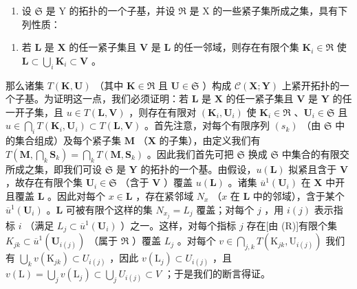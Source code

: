 \begin{enumerate}
\def\labelenumi{\arabic{enumi})}
\setcounter{enumi}{1}
\tightlist
\item
  设 \(\mathfrak{S}\) 是 Y 的拓扑的一个子基，并设 \(\mathfrak{R}\) 是 X 的一些紧子集所成之集，具有下列性质：
\end{enumerate}

\begin{enumerate}
\def\labelenumi{(\Alph{enumi})}
\setcounter{enumi}{17}
\tightlist
\item
  若 \(\mathbf{L}\) 是 \(\mathbf{X}\) 的任一紧子集且 \(\mathbf{V}\) 是 \(\mathbf{L}\) 的任一邻域，则存在有限个集 \(\mathbf{K}_i \in \mathfrak{R}\) 使 \(\mathbf{L} \subset \bigcup_{i} \mathbf{K}_i \subset \mathbf{V}\) 。
\end{enumerate}

那么诸集 \(T(\mathbf{K}, \mathbf{U})\) （其中 \(\mathbf{K} \in \mathfrak{R}\) 且 \(\mathbf{U} \in \mathfrak{S}\) ）构成 \(\mathcal{C}(\mathbf{X}; \mathbf{Y})\) 上紧开拓扑的一个子基。为证明这一点，我们必须证明：若 \(\mathbf{L}\) 是 \(\mathbf{X}\) 的任一紧子集且 \(\mathbf{V}\) 是 \(\mathbf{Y}\) 的任一开子集，且 \(u \in T(\mathbf{L}, \mathbf{V})\) ，则存在有限对 \((\mathbf{K}_i, \mathbf{U}_i)\) 使 \(\mathbf{K}_i \in \mathfrak{R}\) 、\(\mathbf{U}_i \in \mathfrak{S}\) 且 \(u \in \bigcap_{i} T(\mathbf{K}_i, \mathbf{U}_i) \subset T(\mathbf{L}, \mathbf{V})\) 。首先注意，对每个有限序列 \((s_k)\) （由 \(\mathfrak{S}\) 中的集合组成）及每个紧子集 \(\mathbf{M}\) （\(\mathbf{X}\) 的子集），由定义我们有 \(T\left(\mathbf{M}, \bigcap_k \mathbf{S}_k\right) = \bigcap_k T(\mathbf{M}, \mathbf{S}_k)\) 。因此我们首先可把 \(\mathfrak{S}\) 换成 \(\mathfrak{S}\) 中集合的有限交所成之集，即我们可设 \(\mathfrak{S}\) 是 \(\mathbf{Y}\) 的拓扑的一个基。由假设，\(u(\mathbf{L})\) 拟紧且含于 \(\mathbf{V}\) ，故存在有限个集 \(\mathbf{U}_i \in \mathfrak{S}\) （含于 \(\mathbf{V}\) ）覆盖 \(u(\mathbf{L})\) 。诸集 \(\overline{u}^1(\mathbf{U}_i)\) 在 \(\mathbf{X}\) 中开且覆盖 \(\mathbf{L}\) 。因此对每个 \(x \in \mathbf{L}\) ，存在紧邻域 \(N_x\) （\(x\) 在 \(\mathbf{L}\) 中的邻域），含于某个 \(\overline{u}^1(\mathbf{U}_i)\) 。\(\mathbf{L}\) 可被有限个这样的集 \(N_{x_j} = L_j\) 覆盖；对每个 \(j\) ，用 \(i(j)\) 表示指标 \(i\) （满足 \(L_j \subset \overline{u}^1(\mathbf{U}_i)\) ）之一。这样，对每个指标 \(j\) 存在{[}由 (R){]}有限个集 \(K_{jk} \subset \overline{u}^1(\mathbf{U}_{i(j)})\) （属于 \(\mathfrak{R}\) ）覆盖 \(L_j\) 。对每个 \(v \in \bigcap_{j,k} T(\mathrm{K}_{jk}, \mathrm{U}_{i(j)})\) 我们有 \(\bigcup_{k} v(\mathrm{K}_{jk}) \subset U_{i(j)}\) ，因此 \(v(\mathrm{L}_j) \subset U_{i(j)}\) ，且 \(v(\mathrm{L}) = \bigcup_{j} v(\mathrm{L}_j) \subset \bigcup_{j} U_{i(j)} \subset V\) ；于是我们的断言得证。

